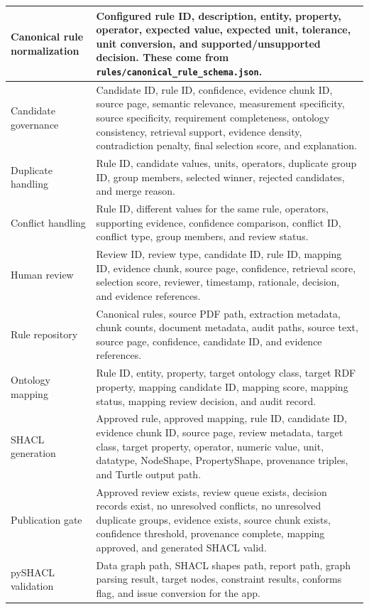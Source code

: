 \documentclass[11pt,a4paper]{article}
\begin{document}
\begin{longtable}{|p{3.8cm}|p{11.3cm}|}
\hline
Canonical rule normalization &
Configured rule ID, description, entity, property, operator, expected value, expected unit, tolerance, unit conversion, and supported/unsupported decision. These come from \texttt{rules/canonical\_rule\_schema.json}. \\
\hline
Candidate governance &
Candidate ID, rule ID, confidence, evidence chunk ID, source page, semantic relevance, measurement specificity, source specificity, requirement completeness, ontology consistency, retrieval support, evidence density, contradiction penalty, final selection score, and explanation. \\
\hline
Duplicate handling &
Rule ID, candidate values, units, operators, duplicate group ID, group members, selected winner, rejected candidates, and merge reason. \\
\hline
Conflict handling &
Rule ID, different values for the same rule, operators, supporting evidence, confidence comparison, conflict ID, conflict type, group members, and review status. \\
\hline
Human review &
Review ID, review type, candidate ID, rule ID, mapping ID, evidence chunk, source page, confidence, retrieval score, selection score, reviewer, timestamp, rationale, decision, and evidence references. \\
\hline
Rule repository &
Canonical rules, source PDF path, extraction metadata, chunk counts, document metadata, audit paths, source text, source page, confidence, candidate ID, and evidence references. \\
\hline
Ontology mapping &
Rule ID, entity, property, target ontology class, target RDF property, mapping candidate ID, mapping score, mapping status, mapping review decision, and audit record. \\
\hline
SHACL generation &
Approved rule, approved mapping, rule ID, candidate ID, evidence chunk ID, source page, review metadata, target class, target property, operator, numeric value, unit, datatype, NodeShape, PropertyShape, provenance triples, and Turtle output path. \\
\hline
Publication gate &
Approved review exists, review queue exists, decision records exist, no unresolved conflicts, no unresolved duplicate groups, evidence exists, source chunk exists, confidence threshold, provenance complete, mapping approved, and generated SHACL valid. \\
\hline
pySHACL validation &
Data graph path, SHACL shapes path, report path, graph parsing result, target nodes, constraint results, conforms flag, and issue conversion for the app. \\

\end{longtable}
\end{document}
